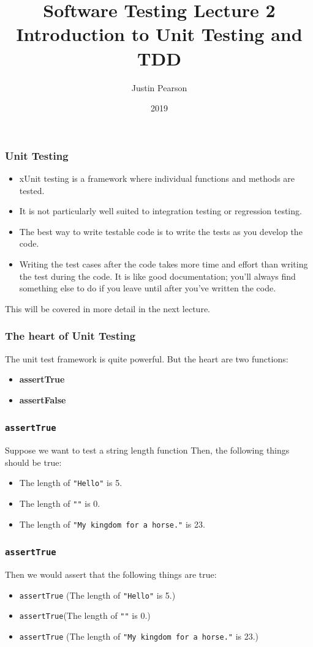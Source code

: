 \documentclass{beamer}
\title{Software Testing Lecture 2 \\ Introduction to Unit Testing and TDD}
\author{Justin Pearson}
\date{2019}
\begin{document}
\begin{frame}
  \maketitle
\end{frame}
  \begin{frame}
  \frametitle{Unit Testing}
  \begin{itemize}
  \item xUnit testing is a framework where individual functions and
    methods are tested. 
  \item It is not particularly well suited to integration testing or
    regression testing.
  \item The best way to write testable code is to write the tests as
    you develop the code. 
  \item Writing the test cases after the code takes more time and
    effort than writing the test during the code. It is like good
    documentation; you'll always find something else to do if you leave
    until after you've written the code.  
  \end{itemize}
  This will be covered in more detail in the next lecture.
\end{frame}
\begin{frame}
  \frametitle{The heart of Unit Testing}

  The unit test framework is quite powerful. But the heart are two
  functions:
  \begin{itemize}
  \item {\bf assertTrue} 
  \item {\bf assertFalse}
  \end{itemize}
\end{frame}

\begin{frame}
  \frametitle{{\tt assertTrue}}
 Suppose we want to test a  string length function
Then, the following things should be true:
\begin{itemize}
\item The length of {\tt "Hello"} is 5.
\item The length of {\tt ""} is 0.
\item The length of {\tt "My kingdom for a horse."} is 23.
\end{itemize}
\end{frame}
\begin{frame}
  \frametitle{{\tt assertTrue}}
Then we would assert that the following things are true:
\begin{itemize}
\item {\tt assertTrue} (The length of {\tt "Hello"} is 5.)
\item  {\tt assertTrue}(The length of {\tt ""} is 0.)
\item  {\tt assertTrue} (The length of {\tt "My kingdom for a horse."}
  is 23.)
\end{itemize}
\end{frame}
\end{document}
